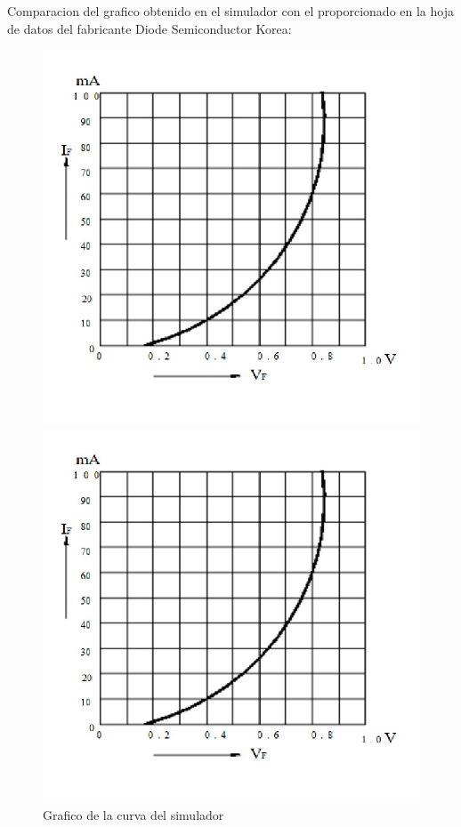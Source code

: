 \documentclass[chaptersright]{informeutn}
\begin{document}
          Comparacion del grafico obtenido en el simulador con el proporcionado en la hoja de datos del fabricante
          Diode Semiconductor Korea:

          \begin{figure}[!h]
            \centering
            \begin{minipage}[b]{0.4\textwidth}
              \includegraphics[width=1.1\linewidth]{pictures/Curva_Datash_Ge.jpg}
              \caption{Grafico de la curva del simulador}
            \end{minipage}
            \hfill
            \begin{minipage}[b]{0.4\textwidth}
              \includegraphics[width=1.1\linewidth]{pictures/Curva_Datash_Ge.jpg}

\end{minipage}
\end{figure}
\end{document}
